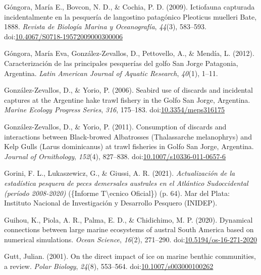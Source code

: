 \documentclass[
]{article}
\newlength{\cslhangindent}
\newlength{\cslentryspacingunit} %
\newenvironment{CSLReferences}[2] %
 {%
  \setlength{\parindent}{0pt}
  \ifodd #1
  \let\oldpar\par
  \def\par{\hangindent=\cslhangindent\oldpar}
  \fi
  \setlength{\parskip}{#2\cslentryspacingunit}
 }%
 {}
\begin{document}
\begin{CSLReferences}{1}{0}
\leavevmode{}%
Góngora, María E., Bovcon, N. D., \& Cochia, P. D. (2009). Ictiofauna
capturada incidentalmente en la pesquería de langostino patagónico
{Pleoticus} muelleri {Bate}, 1888. \emph{Revista de Biología Marina y
Oceanografía}, \emph{44}(3), 583--593.
doi:\href{https://doi.org/10.4067/S0718-19572009000300006}{10.4067/S0718-19572009000300006}

\leavevmode{}%
Góngora, María Eva, González-Zevallos, D., Pettovello, A., \& Mendía, L.
(2012). Caracterización de las principales pesquerías del golfo {San
Jorge Patagonia}, {Argentina}. \emph{Latin American Journal of Aquatic
Research}, \emph{40}(1), 1--11.

\leavevmode{}%
González-Zevallos, D., \& Yorio, P. (2006). Seabird use of discards and
incidental captures at the {Argentine} hake trawl fishery in the {Golfo
San Jorge}, {Argentina}. \emph{Marine Ecology Progress Series},
\emph{316}, 175--183.
doi:\href{https://doi.org/10.3354/meps316175}{10.3354/meps316175}

\leavevmode{}%
González-Zevallos, D., \& Yorio, P. (2011). Consumption of discards and
interactions between {Black-browed Albatrosses} ({Thalassarche}
melanophrys) and {Kelp Gulls} ({Larus} dominicanus) at trawl fisheries
in {Golfo San Jorge}, {Argentina}. \emph{Journal of Ornithology},
\emph{152}(4), 827--838.
doi:\href{https://doi.org/10.1007/s10336-011-0657-6}{10.1007/s10336-011-0657-6}

\leavevmode{}%
Gorini, F. L., Lukaszewicz, G., \& Giussi, A. R. (2021).
\emph{{Actualización de la estadística pesquera de peces demersales
australes en el Atlántico Sudoccidental (período 2008-2020)}} (\{Informe
T\textbackslash\textquotesingle ecnico Oficial\}) (p. 64). {Mar del
Plata}: {Instituto Nacional de Investigación y Desarrollo Pesquero
(INIDEP)}.

\leavevmode{}%
Guihou, K., Piola, A. R., Palma, E. D., \& Chidichimo, M. P. (2020).
Dynamical connections between large marine ecosystems of austral {South
America} based on numerical simulations. \emph{Ocean Science},
\emph{16}(2), 271--290.
doi:\href{https://doi.org/10.5194/os-16-271-2020}{10.5194/os-16-271-2020}

\leavevmode{}%
Gutt, Julian. (2001). On the direct impact of ice on marine benthic
communities, a review. \emph{Polar Biology}, \emph{24}(8), 553--564.
doi:\href{https://doi.org/10.1007/s003000100262}{10.1007/s003000100262}


\end{CSLReferences}
\end{document}
